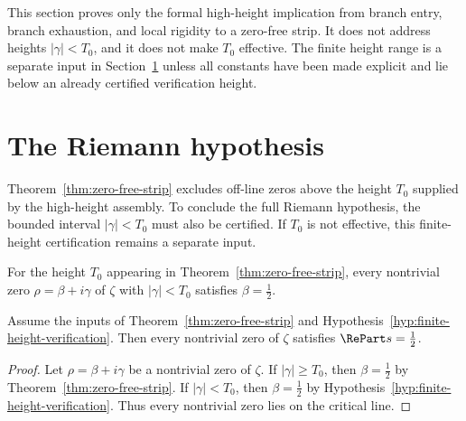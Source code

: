 \begin{remark}
\label{rem:zero-free-strip-scope}
This section proves only the formal high-height implication from branch entry,
branch exhaustion, and local rigidity to a zero-free strip.  It does not address
heights \(|\gamma|<T_0\), and it does not make \(T_0\) effective.  The finite
height range is a separate input in Section~\ref{sec:riemann-hypothesis} unless
all constants have been made explicit and lie below an already certified
verification height.
\end{remark}

\section{The Riemann hypothesis}
\label{sec:riemann-hypothesis}
\quad
{}\quad
{}\quad
{}\quad
{}\quad
{}
\par\medskip

Theorem~\ref{thm:zero-free-strip} excludes off-line zeros above the height
\(T_0\) supplied by the high-height assembly.  To conclude the full Riemann
hypothesis, the bounded interval \(|\gamma|<T_0\) must also be certified.  If
\(T_0\) is not effective, this finite-height certification remains a separate
input.

\begin{hypothesis}
\label{hyp:finite-height-verification}
For the height \(T_0\) appearing in Theorem~\ref{thm:zero-free-strip}, every
nontrivial zero \(\rho=\beta+i\gamma\) of \(\zeta\) with \(|\gamma|<T_0\)
satisfies \(\beta=\tfrac12\).
\end{hypothesis}

\begin{theorem}
\label{thm:riemann-hypothesis}
Assume the inputs of Theorem~\ref{thm:zero-free-strip} and
Hypothesis~\ref{hyp:finite-height-verification}.  Then every nontrivial zero
of \(\zeta\) satisfies \(\RePart s = \tfrac12\).
\end{theorem}

\begin{proof}
Let \(\rho=\beta+i\gamma\) be a nontrivial zero of \(\zeta\).  If
\(|\gamma|\ge T_0\), then \(\beta=\tfrac12\) by
Theorem~\ref{thm:zero-free-strip}.  If \(|\gamma|<T_0\), then
\(\beta=\tfrac12\) by Hypothesis~\ref{hyp:finite-height-verification}.
Thus every nontrivial zero lies on the critical line.
\end{proof}

